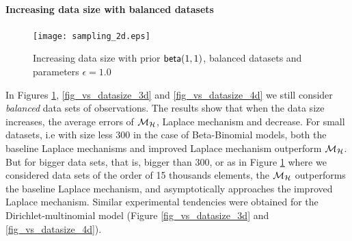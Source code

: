 \documentclass{article}
\begin{document}
\paragraph{Increasing data size with balanced datasets}
\label{subsubsec_vs_datasize}

\begin{figure}
\begin{center}
\centering
    \texttt{[image: sampling\_2d.eps]}
\caption{Increasing data size with prior $\mathsf{beta}(1,1)$, balanced datasets and parameters $\epsilon = 1.0$}
\label{fig_vs_datasize_2d}
\end{center}
\end{figure}

\begin{figure}[ht]
\begin{center}
\centering
{}
\end{center}
\end{figure}



In Figures \ref{fig_vs_datasize_2d}, \ref{fig_vs_datasize_3d} and \ref{fig_vs_datasize_4d} we still consider \emph{balanced} data sets
of observations. The results show that when the data size increases, the average errors of
$\mathcal{M}_{\mathcal{H}}$, Laplace mechanism and decrease. For small datasets,
i.e with size less $300$ in the case of Beta-Binomial models,
both the baseline Laplace mechanisms and improved Laplace mechanism outperform $\mathcal{M}_{\mathcal{H}}$.
But for bigger data sets, that is, bigger than $300$, or as in Figure \ref{fig_vs_datasize_2d} where
we considered data sets of the order of 15 thousands elements,
the $\mathcal{M}_{\mathcal{H}}$ outperforms the baseline Laplace mechanism, and asymptotically approaches the improved Laplace mechanism.
Similar experimental tendencies were obtained for the Dirichlet-multinomial model (Figure \ref{fig_vs_datasize_3d} and \ref{fig_vs_datasize_4d}).
\end{document}
